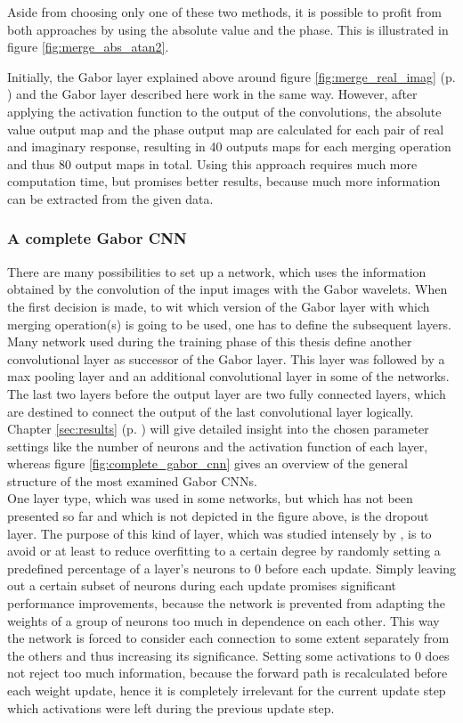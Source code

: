 \documentclass[11pt, a4paper]{article}
\newcommand\myref[1]{\ref{#1} (p. \pageref{#1})}
\begin{document}
Aside from choosing only one of these two methods, it is possible to profit from both approaches by using the absolute value and the phase. This is illustrated in figure \ref{fig:merge_abs_atan2}.

Initially, the Gabor layer explained above around figure \myref{fig:merge_real_imag} and the Gabor layer described here work in the same way. However, after applying the activation function to the output of the convolutions, the absolute value output map and the phase output map are calculated for each pair of real and imaginary response, resulting in 40 outputs maps for each merging operation and thus 80 output maps in total. Using this approach requires much more computation time, but promises better results, because much more information can be extracted from the given data.

\subsubsection{A complete Gabor CNN}

There are many possibilities to set up a network, which uses the information obtained by the convolution of the input images with the Gabor wavelets. When the first decision is made, to wit which version of the Gabor layer with which merging operation(s) is going to be used, one has to define the subsequent layers. Many network used during the training phase of this thesis define another convolutional layer as successor of the Gabor layer. This layer was followed by a max pooling layer and an additional convolutional layer in some of the networks. The last two layers before the output layer are two fully connected layers, which are destined to connect the output of the last convolutional layer logically. Chapter \myref{sec:results} will give detailed insight into the chosen parameter settings like the number of neurons and the activation function of each layer, whereas figure \ref{fig:complete_gabor_cnn} gives an overview of the general structure of the most examined Gabor \acp{CNN}.
\\
One layer type, which was used in some networks, but which has not been presented so far and which is not depicted in the figure above, is the dropout layer. The purpose of this kind of layer, which was studied intensely by \cite{dropout}, is to avoid or at least to reduce overfitting to a certain degree by randomly setting a predefined percentage of a layer's neurons to $0$ before each update. Simply leaving out a certain subset of neurons during each update promises significant performance improvements, because the network is prevented from adapting the weights of a group of neurons too much in dependence on each other. This way the network is forced to consider each connection to some extent separately from the others and thus increasing its significance. Setting some activations to $0$ does not reject too much information, because the forward path is recalculated before each weight update, hence it is completely irrelevant for the current update step which activations were left during the previous update step.
\end{document}
